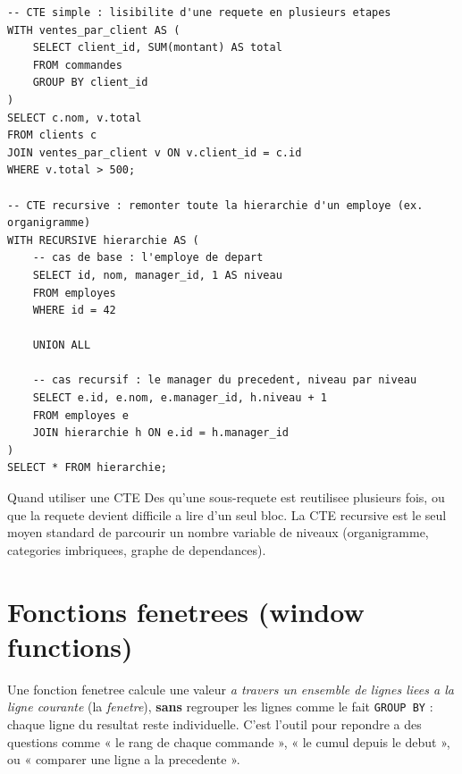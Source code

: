 \documentclass[11pt,a4paper]{article}
\begin{document}
\begin{lstlisting}
-- CTE simple : lisibilite d'une requete en plusieurs etapes
WITH ventes_par_client AS (
    SELECT client_id, SUM(montant) AS total
    FROM commandes
    GROUP BY client_id
)
SELECT c.nom, v.total
FROM clients c
JOIN ventes_par_client v ON v.client_id = c.id
WHERE v.total > 500;

-- CTE recursive : remonter toute la hierarchie d'un employe (ex. organigramme)
WITH RECURSIVE hierarchie AS (
    -- cas de base : l'employe de depart
    SELECT id, nom, manager_id, 1 AS niveau
    FROM employes
    WHERE id = 42

    UNION ALL

    -- cas recursif : le manager du precedent, niveau par niveau
    SELECT e.id, e.nom, e.manager_id, h.niveau + 1
    FROM employes e
    JOIN hierarchie h ON e.id = h.manager_id
)
SELECT * FROM hierarchie;
\end{lstlisting}

\begin{infobox}{Quand utiliser une CTE}
Des qu'une sous-requete est reutilisee plusieurs fois, ou que la requete
devient difficile a lire d'un seul bloc. La CTE recursive est le seul moyen
standard de parcourir un nombre variable de niveaux (organigramme, categories
imbriquees, graphe de dependances).
\end{infobox}

\section{Fonctions fenetrees (window functions)}
Une fonction fenetree calcule une valeur \emph{a travers un ensemble de lignes
liees a la ligne courante} (la \emph{fenetre}), \textbf{sans} regrouper les
lignes comme le fait \texttt{GROUP BY} : chaque ligne du resultat reste
individuelle. C'est l'outil pour repondre a des questions comme « le rang de
chaque commande », « le cumul depuis le debut », ou « comparer une ligne a la
precedente ».
\end{document}
